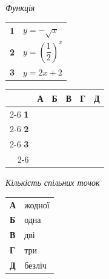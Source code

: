 \documentclass[14pt]{extarticle}
\begin{document}
\vspace{0.3cm}

\noindent
\begin{minipage}[t]{0.45\textwidth}
    \textit{Функція} \par \vspace{0.2cm}
    \begin{tabular}{@{}p{0.5cm} p{5cm}@{}}
    \textbf{1} & $y=-\sqrt{x}$ \\[0.3cm]
    \textbf{2} & $y=\left(\dfrac{1}{2}\right)^x$ \\[0.5cm]
    \textbf{3} & $y=2x+2$ \\
    \end{tabular}
    
    \vspace{0.5cm}
    
    \begingroup
    \setlength{\tabcolsep}{4pt}
    \renewcommand{\arraystretch}{1.2}
    \small
    \begin{tabular}{r|c|c|c|c|c|}
         \multicolumn{1}{c}{} & \multicolumn{1}{c}{\textbf{А}} & \multicolumn{1}{c}{\textbf{Б}} & \multicolumn{1}{c}{\textbf{В}} & \multicolumn{1}{c}{\textbf{Г}} & \multicolumn{1}{c}{\textbf{Д}} \\ \cline{2-6}
         \textbf{1} & & & & & \\ \cline{2-6}
         \textbf{2} & & & & & \\ \cline{2-6}
         \textbf{3} & & & & & \\ \cline{2-6}
    \end{tabular}
    \endgroup
\end{minipage}%
\hfill
\begin{minipage}[t]{0.50\textwidth}
    \textit{Кількість спільних точок} \par \vspace{0.2cm}
    \begin{tabular}{@{}p{0.5cm} p{7.5cm}@{}}
    \textbf{А} & жодної \\[0.3cm]
    \textbf{Б} & одна \\[0.3cm]
    \textbf{В} & дві \\[0.3cm]
    \textbf{Г} & три \\[0.3cm]
    \textbf{Д} & безліч \\
    \end{tabular}
\end{minipage}

\vspace{0.7cm}
\end{document}
